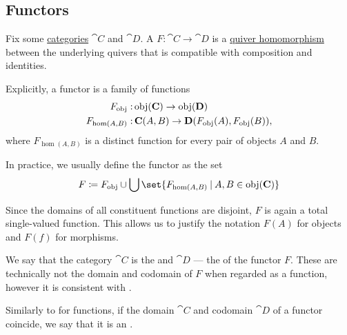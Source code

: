 \subsection{Functors}\label{subsec:functors}

\begin{definition}\label{def:functor}
  Fix some \hyperref[def:category]{categories} \( \cat{C} \) and \( \cat{D} \). A  \( F: \cat{C} \to \cat{D} \) is a \hyperref[eq:def:category_of_small_quivers/homomorphism]{quiver homomorphism} between the underlying quivers that is compatible with composition and identities.

  Explicitly, a functor is a family of functions
  \begin{equation}\label{eq:def:functor_as_family_of_function}
    \begin{aligned}
      F_{\operatorname{obj}}:       &\operatorname{obj}(\operatorname{\mathbf{C}}) \to \operatorname{obj}(\operatorname{\mathbf{D}}) \\
      F_{\hom(A, B)}: &\operatorname{\mathbf{C}}(A, B) \to \operatorname{\mathbf{D}}(F_{\operatorname{obj}}(A), F_{\operatorname{obj}}(B)),
    \end{aligned}
  \end{equation}
  where \( F_{\hom(A, B)} \) is a distinct function for every pair of objects \( A \) and \( B \).

  In practice, we usually define the functor as the set
  \begin{equation}\label{eq:def:functor_as_single_function}
    F \coloneqq F_{\obj} \cup \bigcup\set{ F_{\hom(A, B)} \given A, B \in \obj(\cat{C}) }
  \end{equation}

  Since the domains of all constituent functions are disjoint, \( F \) is again a total single-valued function. This allows us to justify the notation \( F(A) \) for objects and \( F(f) \) for morphisms.

  \begin{thmenum}[resume=def:functor]
     We say that the category \( \cat{C} \) is the  and \( \cat{D} \) --- the  of the functor \( F \). These are technically not the domain and codomain of \( F \) when regarded as a function, however it is consistent with .

     Similarly to  for functions, if the domain \( \cat{C} \) and codomain \( \cat{D} \) of a functor coincide, we say that it is an .
  \end{thmenum}


\end{definition}
